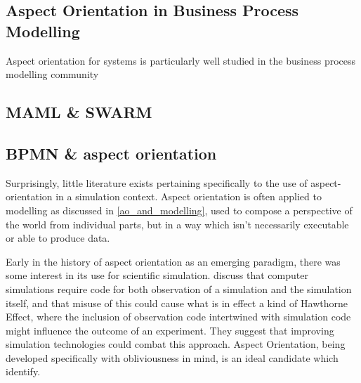 \subsection{Aspect Orientation in Business Process Modelling}
Aspect orientation for \sociotechnical systems is particularly well studied in
the business process modelling
community\cite{Machado_2011,Cappelli_AOBPM}~


\subsection{MAML \& SWARM}


\subsection{BPMN \& aspect orientation}




Surprisingly, little literature exists pertaining specifically to the use of
aspect-orientation in a simulation context. Aspect orientation is often applied
to modelling as discussed in \cref{ao_and_modelling}, used to compose a
perspective of the world from individual parts, but in a way which isn't
necessarily executable or able to produce data.

Early in the history of aspect orientation as an emerging paradigm, there was
some interest in its use for scientific simulation. \cite{gulyas1999use} discuss
that computer simulations require code for both observation of a simulation and
the simulation itself, and that misuse of this could cause what is in effect a
kind of Hawthorne Effect, where
the inclusion of observation code intertwined with simulation code might
influence the outcome of an experiment. They suggest that improving simulation
technologies could combat this approach. Aspect Orientation, being developed
specifically with obliviousness in mind, is an ideal candidate which
\citeauthor{gulyas1999use} identify.

